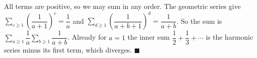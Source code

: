 All terms are positive, so we may sum in any order. The geometric series give $\displaystyle\sum_{c\ge1}\left(\dfrac1{a+1}\right)^c=\dfrac1a$ and $\displaystyle\sum_{d\ge1}\left(\dfrac1{a+b+1}\right)^d=\dfrac1{a+b}$. So the sum is $\displaystyle\sum_{a\ge1}\dfrac1a\sum_{b\ge1}\dfrac1{a+b}$. Already for $a=1$ the inner sum $\dfrac12+\dfrac13+\cdots$ is the harmonic series minus its first term, which diverges. $\blacksquare$

